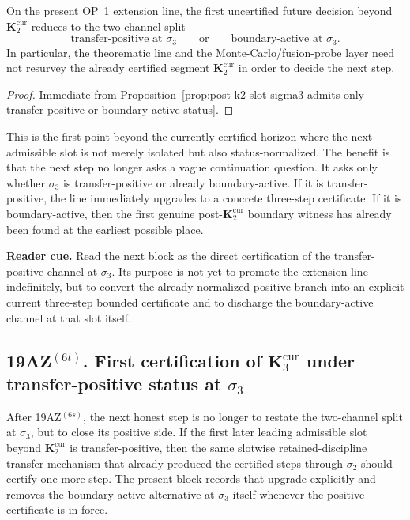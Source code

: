 \begin{corollary}
\label{cor:next-honest-op1-decision-beyond-k2cur-is-two-channel-decision-at-sigma3}
On the present OP~1 extension line, the first uncertified future decision beyond $\mathbf K_2^{\mathrm{cur}}$ reduces to the two-channel split
\[
 \text{transfer-positive at }\sigma_3
 \qquad\text{or}\qquad
 \text{boundary-active at }\sigma_3.
\]
In particular, the theorematic line and the Monte-Carlo/fusion-probe layer need not resurvey the already certified segment $\mathbf K_2^{\mathrm{cur}}$ in order to decide the next step.
\end{corollary}

\begin{proof}
Immediate from Proposition~\ref{prop:post-k2-slot-sigma3-admits-only-transfer-positive-or-boundary-active-status}.
\end{proof}

\begin{remark}
\label{rem:what-first-transfer-positive-boundary-active-split-at-sigma3-now-buys}
This is the first point beyond the currently certified horizon where the next admissible slot is not merely isolated but also status-normalized. The benefit is that the next step no longer asks a vague continuation question. It asks only whether $\sigma_3$ is transfer-positive or already boundary-active. If it is transfer-positive, the line immediately upgrades to a concrete three-step certificate. If it is boundary-active, then the first genuine post-$\mathbf K_2^{\mathrm{cur}}$ boundary witness has already been found at the earliest possible place.
\end{remark}


\noindent\textbf{Reader cue.} Read the next block as the direct certification of the transfer-positive channel at $\sigma_3$. Its purpose is not yet to promote the extension line indefinitely, but to convert the already normalized positive branch into an explicit current three-step bounded certificate and to discharge the boundary-active channel at that slot itself.

\subsection*{19AZ$^{(6t)}$. First certification of $\mathbf K_3^{\mathrm{cur}}$ under transfer-positive status at $\sigma_3$}
\label{sec:first-certification-of-k3cur-under-transfer-positive-status-at-sigma3}
After 19AZ$^{(6s)}$, the next honest step is no longer to restate the two-channel split at $\sigma_3$, but to close its positive side. If the first later leading admissible slot beyond $\mathbf K_2^{\mathrm{cur}}$ is transfer-positive, then the same slotwise retained-discipline transfer mechanism that already produced the certified steps through $\sigma_2$ should certify one more step. The present block records that upgrade explicitly and removes the boundary-active alternative at $\sigma_3$ itself whenever the positive certificate is in force.


